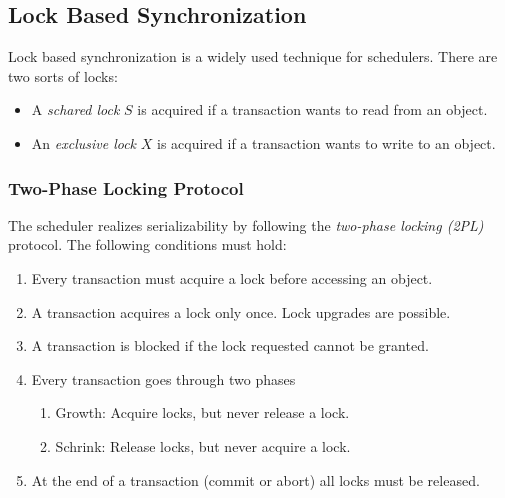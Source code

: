 

\subsection{Lock Based Synchronization}

Lock based synchronization is a widely used technique for schedulers. There are two sorts of locks:
\begin{itemize}
\item A \emph{schared lock} $S$ is acquired if a transaction wants to read from an object.
\item An \emph{exclusive lock} $X$ is acquired if a transaction wants to write to an object.
\end{itemize}




\subsubsection{Two-Phase Locking Protocol}

The scheduler realizes serializability by following the \emph{two-phase locking  (2PL)} protocol. The following conditions must hold:
\begin{enumerate}
\item Every transaction must acquire a lock before accessing an object.
\item A transaction acquires a lock only once. Lock upgrades are possible.
\item A transaction is blocked if the lock requested cannot be granted.
\item Every transaction goes through two phases
	\begin{enumerate}
	\item Growth: Acquire locks, but never release a lock.
	\item Schrink: Release locks, but never acquire a lock.
	\end{enumerate}
\item At the end of a transaction (commit or abort) all locks must be released.
\end{enumerate}

